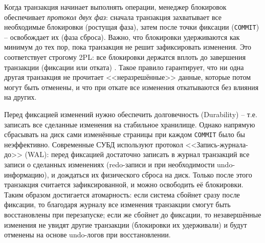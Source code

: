  Когда транзакция начинает выполнять операции, менеджер блокировок обеспечивает \textit{протокол двух фаз}: сначала транзакция захватывает все необходимые блокировки (ростущая фаза), затем после точки фиксации (\texttt{COMMIT}) – освобождает их (фаза сброса). Важно, что блокировки удерживаются как минимум до тех пор, пока транзакция не решит зафиксировать изменения. Это соответствует строгому 2PL: все блокировки держатся вплоть до завершения транзакции (фиксации или отката) \autocite{WashCoursesLec5}. Такое правило гарантирует, что ни одна другая транзакция не прочитает <<неразрешённые>> данные, которые потом могут быть отменены, и что при откате все изменения откатываются без влияния на других. 
 
 Перед фиксацией изменений нужно обеспечить долговечность (Durability) – т.е. записать все сделанные изменения на стабильное хранилище. Однако напрямую сбрасывать на диск сами изменённые страницы при каждом \texttt{COMMIT} было бы неэффективно. Современные СУБД используют протокол <<Запись-журнала-до>> (WAL): перед фиксацией достаточно записать в журнал транзакций все записи о сделанных изменениях (redo-записи и при необходимости undo-информацию), и дождаться их физического сброса на диск. Только после этого транзакция считается зафиксированной, и можно освободить её блокировки. Таким образом достигается атомарность: если система сбойнет сразу после фиксации, то благодаря журналу все изменения транзакции смогут быть восстановлены при перезапуске; если же сбойнет до фиксации, то незавершённые изменения не увидят другие транзакции (блокировки их удерживали) и будут отменены на основе undo-логов при восстановлении. ~\\
 
